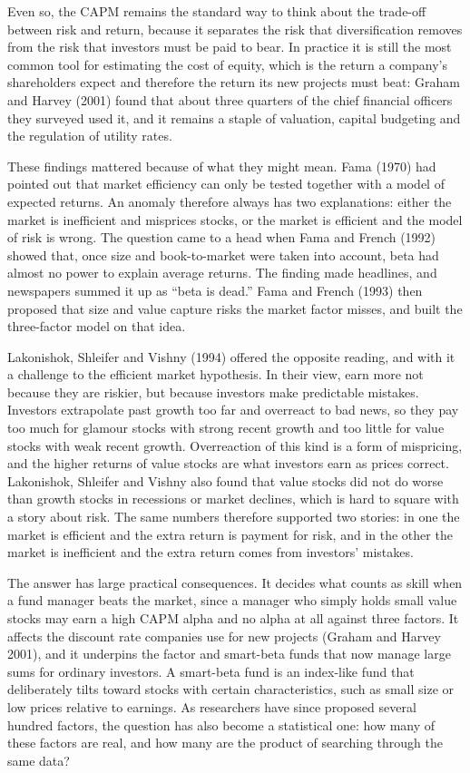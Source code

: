 Even so, the CAPM remains the standard way to think about the trade-off between risk and return, because it separates the risk that diversification removes from the risk that investors must be paid to bear. In practice it is still the most common tool for estimating the cost of equity, which is the return a company's shareholders expect and therefore the return its new projects must beat: Graham and Harvey (2001) found that about three quarters of the chief financial officers they surveyed used it, and it remains a staple of valuation, capital budgeting and the regulation of utility rates. 

These findings mattered because of what they might mean. 
Fama (1970) had pointed out that market efficiency can only be tested together with a model of expected returns. An anomaly therefore always has two explanations: either the market is inefficient and misprices stocks, or the market is efficient and the model of risk is wrong.
The question came to a head when Fama and French (1992) showed that, once size and book-to-market were taken into account, beta had almost no power to explain average returns. The finding made headlines, and newspapers summed it up as ``beta is dead.'' Fama and French (1993) then proposed that size and value capture risks the market factor misses, and built the three-factor model on that idea. 

Lakonishok, Shleifer and Vishny (1994) offered the opposite reading, and with it a challenge to the efficient market hypothesis. In their view,  earn more not because they are riskier, but because investors make predictable mistakes. Investors extrapolate past growth too far and overreact to bad news, so they pay too much for glamour stocks with strong recent growth and too little for value stocks with weak recent growth. Overreaction of this kind is a form of mispricing, and the higher returns of value stocks are what investors earn as prices correct. Lakonishok, Shleifer and Vishny also found that value stocks did not do worse than growth stocks in recessions or market declines, which is hard to square with a story about risk. The same numbers therefore supported two stories: in one the market is efficient and the extra return is payment for risk, and in the other the market is inefficient and the extra return comes from investors' mistakes.

The answer has large practical consequences. It decides what counts as skill when a fund manager beats the market, since a manager who simply holds small value stocks may earn a high CAPM alpha and no alpha at all against three factors. It affects the discount rate companies use for new projects (Graham and Harvey 2001), and it underpins the factor and smart-beta funds that now manage large sums for ordinary investors. A smart-beta fund is an index-like fund that deliberately tilts toward stocks with certain characteristics, such as small size or low prices relative to earnings. As researchers have since proposed several hundred factors, the question has also become a statistical one: how many of these factors are real, and how many are the product of searching through the same data? 

